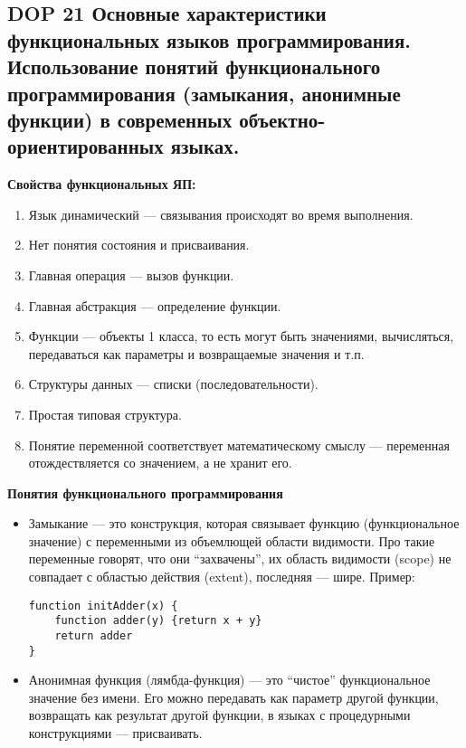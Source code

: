 \subsection*{DOP 21 Основные  характеристики  функциональных  языков  программирования.  Использование  понятий функционального  программирования  (замыкания,  анонимные функции)  в  современных  объектно-ориентированных языках.}

\textbf{Свойства функциональных ЯП:}
\begin{enumerate}
    \item Язык динамический --- связывания происходят во время выполнения.
    \item Нет понятия состояния и присваивания.
    \item Главная операция --- вызов функции.
    \item Главная абстракция --- определение функции.
    \item Функции --- объекты 1 класса, то есть могут быть значениями, вычисляться, передаваться как параметры и возвращаемые значения и т.п.
    \item Структуры данных --- списки (последовательности).
    \item Простая типовая структура.
    \item Понятие переменной соответствует математическому смыслу --- переменная отождествляется со значением, а не хранит его.
\end{enumerate}

\textbf{Понятия функционального программирования}

\begin{itemize}
    \item Замыкание --- это конструкция, которая связывает функцию (функциональное значение) с переменными из объемлющей области видимости.
    Про такие переменные говорят, что они ``захвачены'', их область видимости (scope) не совпадает с областью действия (extent), последняя --- шире.
    Пример:
    \begin{lstlisting}
function initAdder(x) {
    function adder(y) {return x + y}
    return adder
}
    \end{lstlisting}
    \item Анонимная функция (лямбда-функция) --- это ``чистое'' функциональное значение без имени.
    Его можно передавать как параметр другой функции, возвращать как результат другой функции, в языках с процедурными конструкциями --- присваивать.
\end{itemize}

